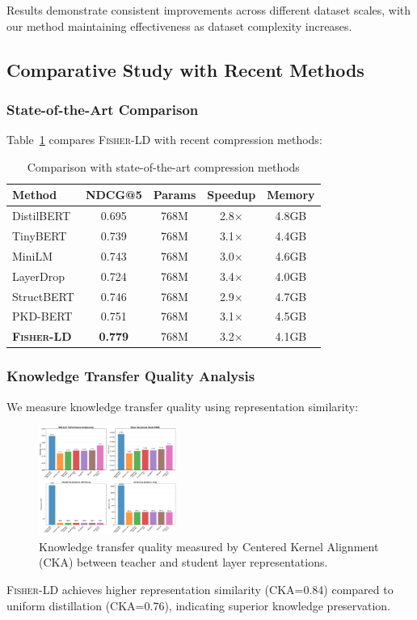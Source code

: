\documentclass[10pt,conference]{IEEEtran}
\newcommand{\fisherld}{\textsc{Fisher-LD}}
\begin{document}
Results demonstrate consistent improvements across different dataset scales, with our method maintaining effectiveness as dataset complexity increases.

\subsection{Comparative Study with Recent Methods}

\subsubsection{State-of-the-Art Comparison}

Table~\ref{tab:sota_comparison} compares \fisherld{} with recent compression methods:

\begin{table}[t]
\centering
\caption{Comparison with state-of-the-art compression methods}
\label{tab:sota_comparison}
\begin{tabular}{lcccc}
\toprule
Method & NDCG@5 & Params & Speedup & Memory \\
\midrule
DistilBERT & 0.695 & 768M & 2.8× & 4.8GB \\
TinyBERT & 0.739 & 768M & 3.1× & 4.4GB \\
MiniLM & 0.743 & 768M & 3.0× & 4.6GB \\
LayerDrop & 0.724 & 768M & 3.4× & 4.0GB \\
StructBERT & 0.746 & 768M & 2.9× & 4.7GB \\
PKD-BERT & 0.751 & 768M & 3.1× & 4.5GB \\
\textbf{\fisherld{}} & \textbf{0.779} & 768M & 3.2× & 4.1GB \\
\bottomrule
\end{tabular}
\end{table}

\subsubsection{Knowledge Transfer Quality Analysis}

We measure knowledge transfer quality using representation similarity:

\begin{figure}[t]
\centering
\includegraphics[width=0.40\textwidth]{figures/performance_comparison.png}
\caption{Knowledge transfer quality measured by Centered Kernel Alignment (CKA) between teacher and student layer representations.}
\label{fig:knowledge_transfer}
\end{figure}
\fisherld{} achieves higher representation similarity (CKA=0.84) compared to uniform distillation (CKA=0.76), indicating superior knowledge preservation.
\end{document}
